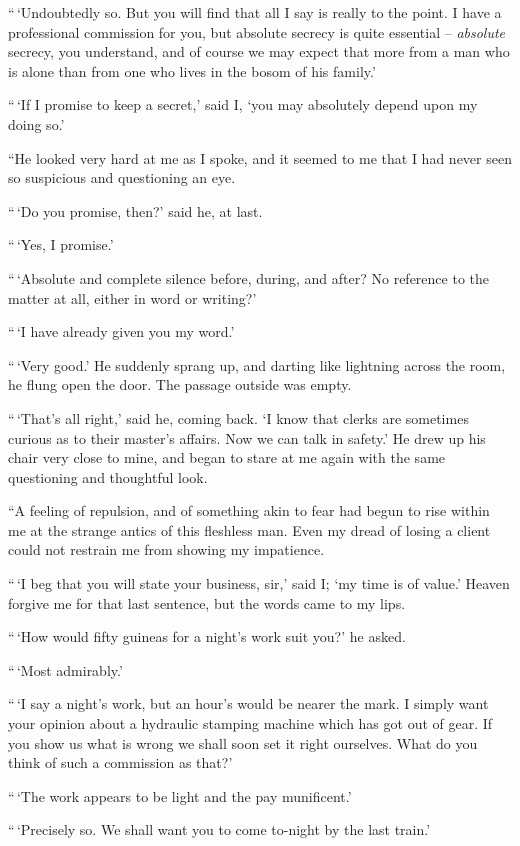 “\,‘Undoubtedly so. But you will find that all I say is really
to the point. I have a professional commission for you, but
absolute secrecy is quite essential -- \textit{absolute} secrecy, you
understand, and of course we may expect that more from a man
who is alone than from one who lives in the bosom of his
family.’

“\,‘If I promise to keep a secret,’ said I, ‘you may absolutely
depend upon my doing so.’

“He looked very hard at me as I spoke, and it seemed to
me that I had never seen so suspicious and questioning an
eye.

“\,‘Do you promise, then?’ said he, at last.

“\,‘Yes, I promise.’

“\,‘Absolute and complete silence before, during, and after?
No reference to the matter at all, either in word or writing?’

“\,‘I have already given you my word.’

“\,‘Very good.’ He suddenly sprang up, and darting like
lightning across the room, he flung open the door. The passage
outside was empty.

“\,‘That’s all right,’ said he, coming back. ‘I know that clerks
are sometimes curious as to their master’s affairs. Now we
can talk in safety.’ He drew up his chair very close to mine,
and began to stare at me again with the same questioning and
thoughtful look.

“A feeling of repulsion, and of something akin to fear had
begun to rise within me at the strange antics of this fleshless
man. Even my dread of losing a client could not restrain
me from showing my impatience.

“\,‘I beg that you will state your business, sir,’ said I; ‘my
time is of value.’ Heaven forgive me for that last sentence,
but the words came to my lips.

“\,‘How would fifty guineas for a night’s work suit you?’
he asked.

“\,‘Most admirably.’

“\,‘I say a night’s work, but an hour’s would be nearer the
mark. I simply want your opinion about a hydraulic stamping
machine which has got out of gear. If you show us what
is wrong we shall soon set it right ourselves. What do you
think of such a commission as that?’

“\,‘The work appears to be light and the pay munificent.’

“\,‘Precisely so. We shall want you to come to-night by
the last train.’

